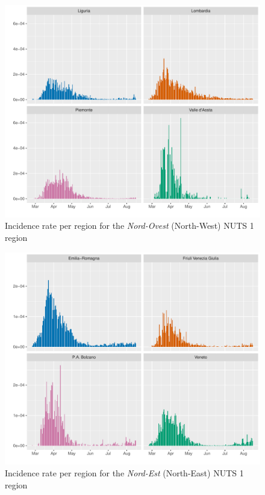 \documentclass[12pt]{article}
\begin{document}
\begin{appendices}
		\begin{figure}[H]
    	    \centering
    	    \includegraphics[width=\textwidth]{output/infective_rates_Nord-Ovest.pdf}
    	    \caption{Incidence rate per region for the \textit{Nord-Ovest} (North-West) NUTS 1 region}
    	    \label{fig:incidence_nordovest}
    	\end{figure}
    	
    	\begin{figure}[H]
    	    \centering
    	    \includegraphics[width=\textwidth]{output/infective_rates_Nord-Est.pdf}
    	    \caption{Incidence rate per region for the \textit{Nord-Est} (North-East) NUTS 1 region}
    	    \label{fig:incidence_nordest}
    	\end{figure}
    	

\end{appendices}
\end{document}
